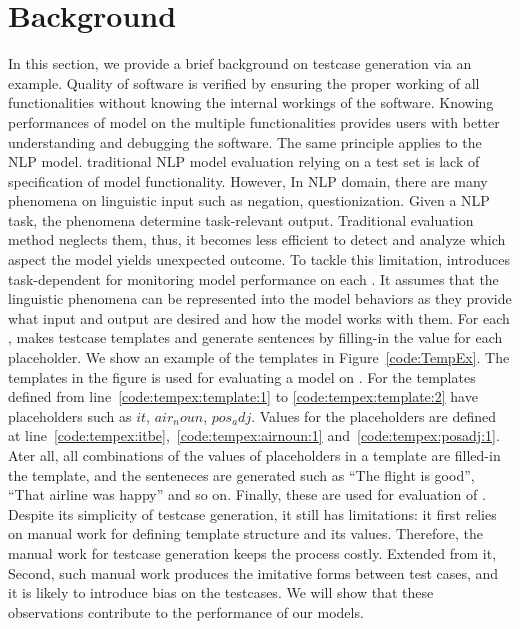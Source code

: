 \section{Background}
\label{sec:background}


\begin{figure}[t]
 \centering
 
 \vspace{-10pt}
 \caption{\CklstTemplateFigCaption}
 \vspace{-10pt}
\end{figure}

In this section, we provide a brief background on \Cklst testcase
generation via an example. Quality of software is verified by ensuring
the proper working of all functionalities without knowing the internal
workings of the software. Knowing performances of model on the
multiple functionalities provides users with better understanding and
debugging the software. The same principle applies to the NLP model.
traditional NLP model evaluation relying on a test set is lack of
specification of model functionality. However, In NLP domain, there
are many phenomena on linguistic input such as negation,
questionization. Given a NLP task, the phenomena determine
task-relevant output. Traditional evaluation method neglects them,
thus, it becomes less efficient to detect and analyze which aspect the
model yields unexpected outcome. To tackle this limitation, \Cklst
introduces task-dependent \lcs for monitoring model performance on
each \lc. It assumes that the linguistic phenomena can be represented
into the model behaviors as they provide what input and output are
desired and how the model works with them. For each \lc, \Cklst makes
testcase templates and generate sentences by filling-in the value for
each placeholder. We show an example of the templates in
Figure~\ref{code:TempEx}. The templates in the figure is used for
evaluating a \sa model on \SareqExThree. For the templates defined
from line~\ref{code:tempex:template:1} to \ref{code:tempex:template:2}
have placeholders such as ${it}$, ${air_noun}$, ${pos_adj}$. Values
for the placeholders are defined at
line~\ref{code:tempex:itbe},~\ref{code:tempex:airnoun:1}
and~\ref{code:tempex:posadj:1}. Ater all, all combinations of the
values of placeholders in a template are filled-in the template, and
the senteneces are generated such as ``The flight is good'', ``That
airline was happy'' and so on. Finally, these are used for evaluation
of \lc. Despite its simplicity of testcase generation, it still has
limitations: it first relies on manual work for defining template
structure and its values. Therefore, the manual work for testcase
generation keeps the process costly. Extended from it, Second, such
manual work produces the imitative forms between test cases, and it is
likely to introduce bias on the testcases. We will show that these
observations contribute to the performance of our models.
